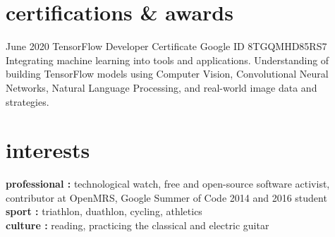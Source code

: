 \documentclass[]{cv-style}          %
\begin{document}
\section{certifications \& awards}

\begin{entrylist}
\entry
{June 2020}
{TensorFlow Developer Certificate}
{Google}
{ID 8TGQMHD85RS7 \\ Integrating machine learning into tools and applications. Understanding of building TensorFlow models using Computer Vision, Convolutional Neural Networks, Natural Language Processing, and real-world image data and strategies.}
\end{entrylist}


\section{interests}
  \vspace{-0.2cm}

\textbf{professional :} technological watch,  free and open-source software activist, contributor at OpenMRS, Google Summer of Code 2014 and 2016 student\\
\textbf{sport :} triathlon, duathlon, cycling, athletics \\
\textbf{culture :} reading, practicing the classical and electric guitar
\end{document}
